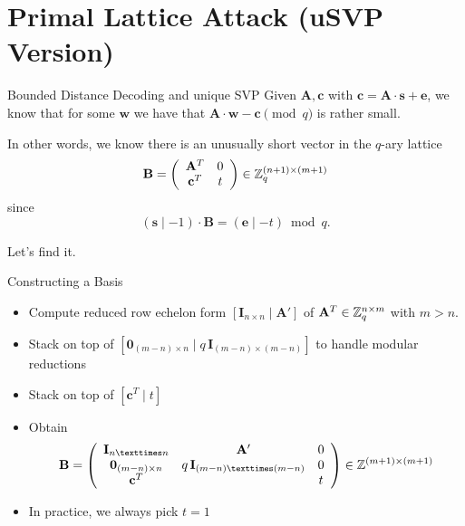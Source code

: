 \documentclass[presentation,smaller]{beamer}
\renewcommand{\vec}[1]{\mathbf{#1}\xspace}
\begin{document}
\section{Primal Lattice Attack (uSVP Version)}
\label{sec:org8b2b189}
\begin{frame}[label={sec:orge4f15bb}]{Bounded Distance Decoding and unique SVP}
Given \(\vec{A}, \vec{c}\) with \(\vec{c} = \vec{A} ⋅ \vec{s} + \vec{e}\), we know that for some \(\vec{w}\) we have that \(\vec{A}⋅\vec{w} - \vec{c} \pmod q\) is rather small.

In other words, we know there is an unusually short vector in the \(q\)-ary lattice \[\vec{B}=\left(\begin{array}{cc}
          \vec{A}^T &  0 \\
          \vec{c}^T   & t \\
        \end{array} \right) \in \ZZ_q^{(n+1) \times (m+1)}\] since \[(\vec{s} \mid -1) ⋅ \vec{B} = (\vec{e} \mid -t) \bmod q.\]

Let’s find it.
\end{frame}

\begin{frame}[label={sec:org7d57729}]{Constructing a Basis}
\begin{itemize}
\item Compute reduced row echelon form \([\vec{I}_{n × n} \mid \vec{A}']\) of \(\vec{A}^T \in \ZZ_q^{n \times m}\) with \(m>n\).
\item Stack on top of \([\vec{0}_{(m-n) \times n} \mid q\,\vec{I}_{(m-n) × (m-n)}]\) to handle modular reductions
\item Stack on top of \([\vec{c}^T \mid t]\)
\item Obtain \[\vec{B}=\left(\begin{array}{ccc}
         \vec{I}_{n × n} & \vec{A}' &  0 \\
         \vec{0}_{(m-n) \times n} & q\,\vec{I}_{(m-n) × (m-n)} & 0\\
          \vec{c}^T  & & t \\
        \end{array} \right) \in \ZZ^{(m+1) \times (m+1)}\]
\item In practice, we always pick \(t=1\)
\end{itemize}
\end{frame}
\end{document}
